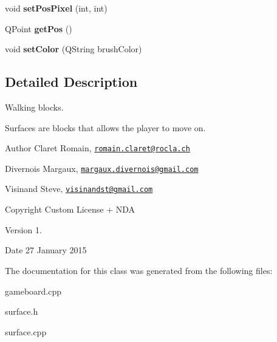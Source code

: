 \begin{DoxyCompactItemize}
\item 
\hypertarget{class_surface_ab63590ebca0d813b110aa286400eac72}{}void {\bfseries set\+Pos\+Pixel} (int, int)\label{class_surface_ab63590ebca0d813b110aa286400eac72}

\item 
\hypertarget{class_surface_acbdbf91a4cca74bb9da6c8a2fa932cd7}{}Q\+Point {\bfseries get\+Pos} ()\label{class_surface_acbdbf91a4cca74bb9da6c8a2fa932cd7}

\item 
\hypertarget{class_surface_ab7dd076ec71f2d6a63fe60f6c011786b}{}void {\bfseries set\+Color} (Q\+String brush\+Color)\label{class_surface_ab7dd076ec71f2d6a63fe60f6c011786b}

\end{DoxyCompactItemize}


\subsection{Detailed Description}
Walking blocks. 

Surfaces are blocks that allows the player to move on. \begin{DoxyAuthor}{Author}
Claret Romain, \href{mailto:romain.claret@rocla.ch}{\tt romain.\+claret@rocla.\+ch} 

Divernois Margaux, \href{mailto:margaux.divernois@gmail.com}{\tt margaux.\+divernois@gmail.\+com} 

Visinand Steve, \href{mailto:visinandst@gmail.com}{\tt visinandst@gmail.\+com} 
\end{DoxyAuthor}
\begin{DoxyCopyright}{Copyright}
Custom License + N\+D\+A 
\end{DoxyCopyright}
\begin{DoxyVersion}{Version}
1. 
\end{DoxyVersion}
\begin{DoxyDate}{Date}
27 January 2015 
\end{DoxyDate}


The documentation for this class was generated from the following files\+:\begin{DoxyCompactItemize}
\item 
gameboard.\+cpp\item 
surface.\+h\item 
surface.\+cpp\end{DoxyCompactItemize}

